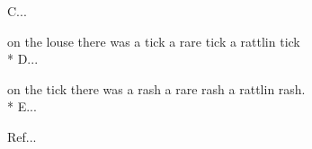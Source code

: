 \begin{SongText}
\begin{SongVerse}
        C...
    \end{SongVerse}
    \begin{SongVerse}
        on the louse there was a tick a rare tick a rattlin tick\\*%
        D...
    \end{SongVerse}
    \begin{SongVerse}
        on the tick there was a rash a rare rash a rattlin rash.\\*%
        E...
    \end{SongVerse}
    \begin{SongVerse}
        Ref...
    \end{SongVerse}
\end{SongText}
